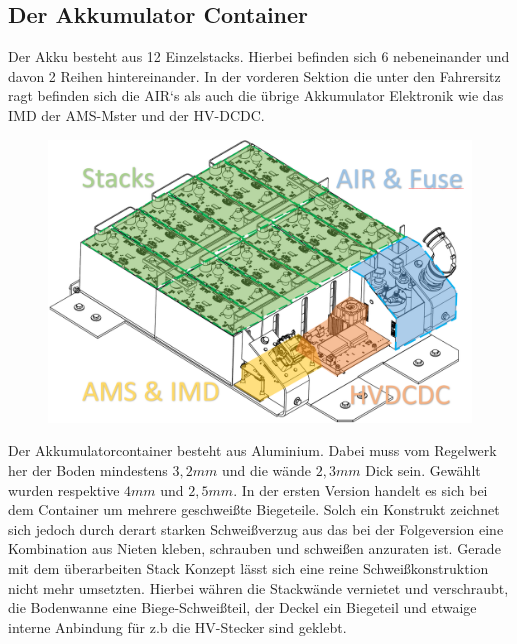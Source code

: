 \FloatBarrier
\subsection{Der Akkumulator Container}

Der Akku besteht aus 12 Einzelstacks. Hierbei befinden sich 6 nebeneinander und davon 2 Reihen hintereinander. In der vorderen Sektion die unter den Fahrersitz ragt befinden sich die \ac{AIR}`s als auch die übrige Akkumulator Elektronik wie das \ac{IMD} der \ac{AMS}-Mster und der \ac{HV}-DCDC.

\begin{figure}
	\centering
	\includegraphics[width=0.7\linewidth]{bilder/HV_Akkumulator_Layout}
	\caption{}
	\label{fig:hvakkumulatorlayout}
\end{figure}


Der Akkumulatorcontainer besteht aus Aluminium. Dabei muss vom Regelwerk her der Boden mindestens \ensuremath{3,2 mm} und die wände \ensuremath{2,3 mm} Dick sein. \cite{FSRules} Gewählt wurden respektive \ensuremath{4 mm} und \ensuremath{2,5 mm}. In der ersten Version handelt es sich bei dem Container um mehrere geschweißte Biegeteile. Solch ein Konstrukt zeichnet sich jedoch durch derart starken Schweißverzug aus das bei der Folgeversion eine Kombination aus Nieten kleben, schrauben und schweißen anzuraten ist. Gerade mit dem überarbeiten Stack Konzept lässt sich eine reine Schweißkonstruktion nicht mehr umsetzten. Hierbei währen die Stackwände vernietet und verschraubt, die Bodenwanne eine Biege-Schweißteil, der Deckel ein Biegeteil und etwaige interne Anbindung für z.b die \ac{HV}-Stecker sind geklebt.

